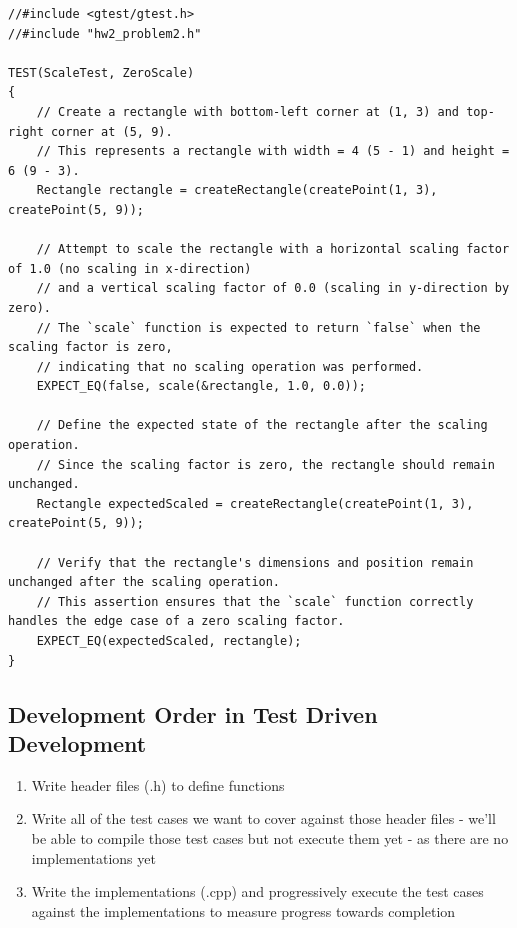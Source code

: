 \documentclass{report}
\begin{document}
\begin{verbatim}
//#include <gtest/gtest.h>
//#include "hw2_problem2.h"

TEST(ScaleTest, ZeroScale)
{
    // Create a rectangle with bottom-left corner at (1, 3) and top-right corner at (5, 9).
    // This represents a rectangle with width = 4 (5 - 1) and height = 6 (9 - 3).
    Rectangle rectangle = createRectangle(createPoint(1, 3), createPoint(5, 9));

    // Attempt to scale the rectangle with a horizontal scaling factor of 1.0 (no scaling in x-direction)
    // and a vertical scaling factor of 0.0 (scaling in y-direction by zero).
    // The `scale` function is expected to return `false` when the scaling factor is zero,
    // indicating that no scaling operation was performed.
    EXPECT_EQ(false, scale(&rectangle, 1.0, 0.0));

    // Define the expected state of the rectangle after the scaling operation.
    // Since the scaling factor is zero, the rectangle should remain unchanged.
    Rectangle expectedScaled = createRectangle(createPoint(1, 3), createPoint(5, 9));

    // Verify that the rectangle's dimensions and position remain unchanged after the scaling operation.
    // This assertion ensures that the `scale` function correctly handles the edge case of a zero scaling factor.
    EXPECT_EQ(expectedScaled, rectangle);
}
\end{verbatim}

\subsection{Development Order in Test Driven Development}

\begin{enumerate}
	\item Write header files (.h) to define functions
	\item Write all of the test cases we want to cover against
	      those header files - we’ll be able to compile those test
	      cases but not execute them yet - as there are no
	      implementations yet
	\item Write the implementations (.cpp) and progressively
	      execute the test cases against the implementations to
	      measure progress towards completion
\end{enumerate}
\end{document}
